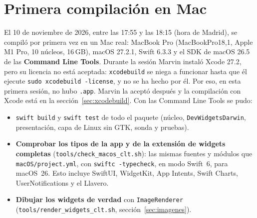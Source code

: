 \documentclass[11pt,a4paper]{article}
\begin{document}
\section{Primera compilación en Mac}\label{sec:mac}
El 10 de noviembre de 2026, entre las 17:55 y las 18:15 (hora de
Madrid), se compiló por primera vez en un Mac real: MacBook Pro
(MacBookPro18,1, Apple M1 Pro, 10 núcleos, 16\,GB), macOS 27.2.1,
Swift 6.3.3 y el SDK de macOS 26.5 de las \textbf{Command Line Tools}.
Durante la sesión Marvin instaló Xcode 27.2, pero su licencia no está
aceptada: \texttt{xcodebuild} se niega a funcionar hasta que él
ejecute \texttt{sudo xcodebuild -license}, y no se ha hecho por él.
Por eso, en esta primera sesión, no hubo \texttt{.app}. Marvin la
aceptó después y la compilación con Xcode está en la
sección~\ref{sec:xcodebuild}. Con las Command Line Tools se pudo:
\begin{itemize}
  \item \texttt{swift build} y \texttt{swift test} de todo el paquete
    (núcleo, \texttt{DevWidgetsDarwin}, presentación, capa de Linux
    sin GTK, sonda y pruebas).
  \item \textbf{Comprobar los tipos de la app y de la extensión de
    widgets completas} (\texttt{tools/check\_macos\_clt.sh}): las
    mismas fuentes y módulos que \texttt{macOS/project.yml}, con
    \texttt{swiftc -typecheck}, en modo Swift~6, para macOS~26. Esto
    incluye SwiftUI, WidgetKit, App Intents, Swift Charts,
    UserNotifications y el Llavero.
  \item \textbf{Dibujar los widgets de verdad} con
    \texttt{ImageRenderer} (\texttt{tools/render\_widgets\_clt.sh},
    sección~\ref{sec:imagenes}).
\end{itemize}
\end{document}
